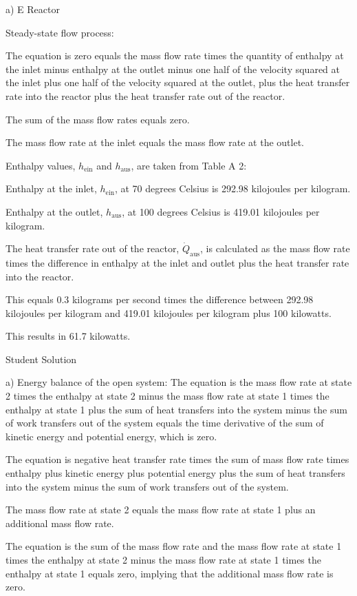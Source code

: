 a) E Reactor

Steady-state flow process:

The equation is zero equals the mass flow rate times the quantity of enthalpy at the inlet minus enthalpy at the outlet minus one half of the velocity squared at the inlet plus one half of the velocity squared at the outlet, plus the heat transfer rate into the reactor plus the heat transfer rate out of the reactor.

The sum of the mass flow rates equals zero.

The mass flow rate at the inlet equals the mass flow rate at the outlet.

Enthalpy values, $h_{\text{ein}}$ and $h_{\text{aus}}$, are taken from Table A 2:

Enthalpy at the inlet, $h_{\text{ein}}$, at 70 degrees Celsius is 292.98 kilojoules per kilogram.

Enthalpy at the outlet, $h_{\text{aus}}$, at 100 degrees Celsius is 419.01 kilojoules per kilogram.

The heat transfer rate out of the reactor, $\dot{Q}_{\text{aus}}$, is calculated as the mass flow rate times the difference in enthalpy at the inlet and outlet plus the heat transfer rate into the reactor.

This equals 0.3 kilograms per second times the difference between 292.98 kilojoules per kilogram and 419.01 kilojoules per kilogram plus 100 kilowatts.

This results in 61.7 kilowatts.

Student Solution

a) Energy balance of the open system:
The equation is the mass flow rate at state 2 times the enthalpy at state 2 minus the mass flow rate at state 1 times the enthalpy at state 1 plus the sum of heat transfers into the system minus the sum of work transfers out of the system equals the time derivative of the sum of kinetic energy and potential energy, which is zero.

The equation is negative heat transfer rate times the sum of mass flow rate times enthalpy plus kinetic energy plus potential energy plus the sum of heat transfers into the system minus the sum of work transfers out of the system.

The mass flow rate at state 2 equals the mass flow rate at state 1 plus an additional mass flow rate.

The equation is the sum of the mass flow rate and the mass flow rate at state 1 times the enthalpy at state 2 minus the mass flow rate at state 1 times the enthalpy at state 1 equals zero, implying that the additional mass flow rate is zero.

